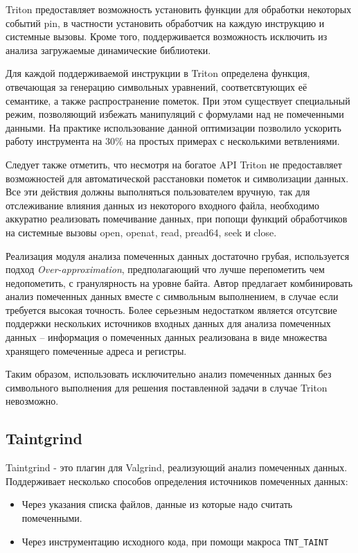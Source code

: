 Triton предоставляет возможность установить функции для обработки некоторых событий pin, в частности установить обработчик на каждую инструкцию и системные вызовы. Кроме того, поддерживается возможность исключить из анализа загружаемые динамические библиотеки.

Для каждой поддерживаемой инструкции в Triton определена функция, отвечающая за генерацию символьных уравнений, соответсвтующих её семантике, а также распространение пометок. При этом существует специальный режим, позволяющий избежать манипуляций с формулами над не помеченными данными. На практике использование данной оптимизации позволило ускорить работу инструмента на 30\% на простых примерах с несколькими ветвлениями.

Следует также отметить, что несмотря на богатое API Triton не предоставляет возможностей для автоматической расстановки пометок и символизации данных. Все эти действия должны выполняться пользователем вручную, так для отслеживание влияния данных из некоторого входного файла, необходимо аккуратно реализовать помечивание данных, при попощи функций обработчиков на системные вызовы open, openat, read, pread64, seek и close.

Реализация модуля анализа помеченных данных достаточно грубая, используется подход 
\emph{Over-approximation}, предполагающий что лучше перепометить чем недопометить, с гранулярность на уровне байта. Автор предлагает комбинировать анализ помеченных данных вместе с символьным выполнением, в случае если требуется высокая точность.
Более серьезным недостатком является отсутсвие поддержки нескольких источников входных данных для анализа помеченных данных -- информация о помеченных данных реализована в виде множества хранящего помеченные адреса и регистры.

Таким образом, использовать исключительно анализ помеченных данных без символьного выполнения для решения поставленной задачи в случае Triton невозможно.

\subsection{Taintgrind}

Taintgrind\cite{Taintgrind} - это плагин для Valgrind, реализующий анализ помеченных данных. Поддерживает несколько способов определения источников помеченных данных:
\begin{itemize}
    \item Через указания списка файлов, данные из которые надо считать помеченными.
    \item Через инструментацию исходного кода, при помощи макроса \texttt{TNT\_TAINT}
\end{itemize}

